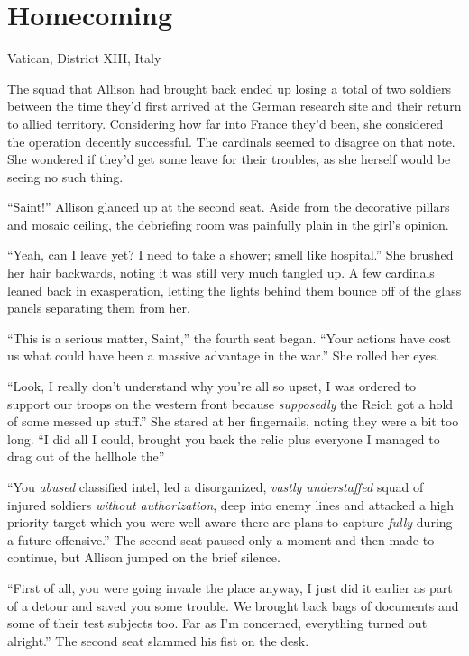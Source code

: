 \chapter{Homecoming}
\begin{ChapterNote}
Vatican, District XIII, Italy
\end{ChapterNote}
\begin{Standard}
The squad that Allison had brought back ended up losing a total of two soldiers
between the time they'd first arrived at the German research site and their return
to allied territory. Considering how far into France they'd been, she considered
the operation decently successful. The cardinals seemed to disagree on that note.
She wondered if they'd get some leave for their troubles, as she herself would be
seeing no such thing.

``Saint!'' Allison glanced up at the second seat. Aside from the decorative pillars
and mosaic ceiling, the debriefing room was painfully plain in the girl's opinion.

``Yeah, can I leave yet? I need to take a shower; smell like hospital.'' She brushed
her hair backwards, noting it was still very much tangled up. A few cardinals leaned back
in exasperation, letting the lights behind them bounce off of the glass panels separating
them from her.

``This is a serious matter, Saint,'' the fourth seat began. ``Your actions have cost us
what could have been a massive advantage in the war.'' She rolled her eyes.

``Look, I really don't understand why you're all so upset, I was ordered to support
our troops on the western front because \emph{supposedly} the Reich got a hold of
some messed up stuff.'' She stared at her fingernails, noting they were a bit too long.
``I did all I could, brought you back the relic plus everyone I managed to drag out of the
hellhole the\textemdash{}''

``You \emph{abused} classified intel, led a disorganized, \emph{vastly understaffed} squad
of injured soldiers \emph{without authorization}, deep into enemy lines and attacked
a high priority target which you were well aware there are plans to capture \emph{fully} during
a future offensive.'' The second seat paused only a moment and then made to continue, but
Allison jumped on the brief silence.

``First of all, you were going invade the place anyway, I just did it earlier as part of
a detour and saved you some trouble. We brought back bags of documents and some of their
test subjects too. Far as I'm concerned, everything turned out alright.'' The second seat
slammed his fist on the desk.


\end{Standard}
